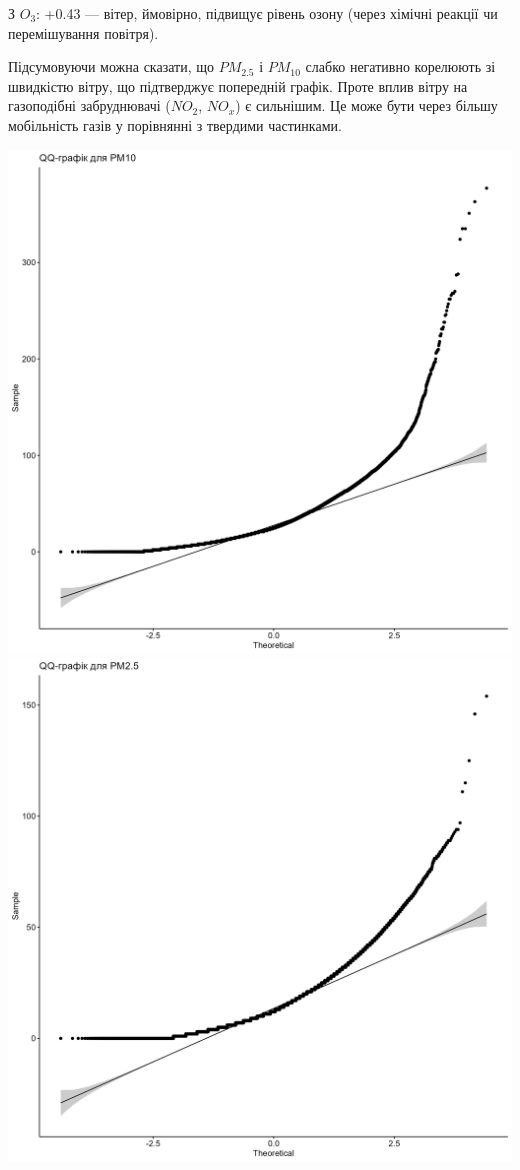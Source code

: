 \documentclass{article}
\begin{document}
\begin{enumerate}
\begin{itemize}
        З $O_3$: +0.43 — вітер, ймовірно, підвищує рівень озону (через хімічні реакції чи перемішування повітря).
    \end{itemize}   

    Підсумовуючи можна сказати, що $PM_{2.5}$ і $ PM_{10}$ слабко негативно корелюють зі швидкістю вітру, що підтверджує попередній графік.
    Проте вплив вітру на газоподібні забруднювачі ($NO_2$, $NO_x$) є сильнішим. 
    Це може бути через більшу мобільність газів у порівнянні з твердими частинками.

    \includegraphics[width=6in]{plots/question1/qq_pm10.png}
    \includegraphics[width=6in]{plots/question1/qq_pm2_5.png}

\end{enumerate}
\end{document}
